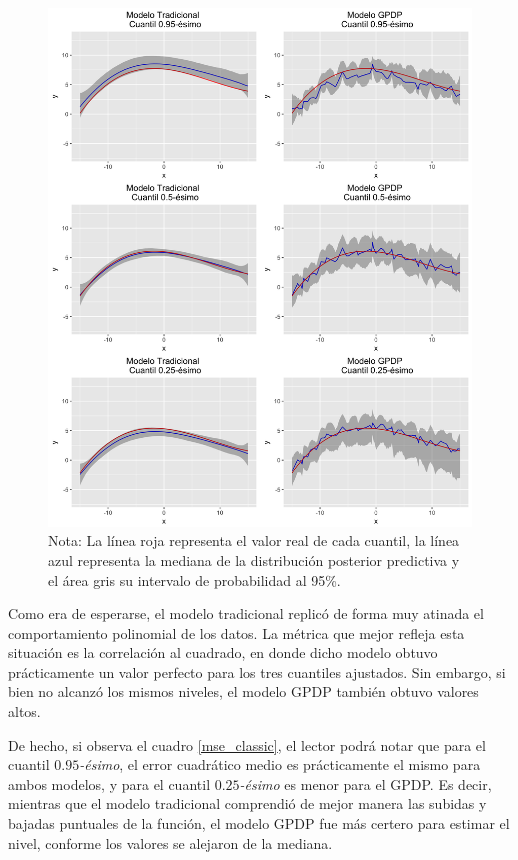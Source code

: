 \begin{figure}[htbp]
	\centering
	\caption{Ajuste de los modelos Tradicional y \textit{GPDP}, para un conjunto de datos que cumplen los supuestos tradicionales de regresi\'on.}
	\includegraphics[width=\textwidth]{Figures/Simulation/classic/predictions.png}
	\captionsetup{singlelinecheck=off,font=footnotesize}
    \caption*{Nota: La l\'inea roja representa el valor real de cada cuantil, la l\'inea azul representa la mediana de la distribuci\'on posterior predictiva y el \'area gris su intervalo de probabilidad al 95\%.}
	\label{models_classic}
\end{figure}

Como era de esperarse, el modelo tradicional replic\'o de forma muy atinada el comportamiento polinomial de los datos. La m\'etrica que mejor refleja esta situaci\'on es la correlaci\'on al cuadrado, en donde dicho modelo obtuvo pr\'acticamente un valor perfecto para los tres cuantiles ajustados. Sin embargo, si bien no alcanz\'o los mismos niveles, el modelo GPDP tambi\'en obtuvo valores altos.

De hecho, si observa el cuadro \ref{mse_classic}, el lector podr\'a notar que para el cuantil $0.95$\textit{-\'esimo}, el error cuadr\'atico medio es pr\'acticamente el mismo para ambos modelos, y para el cuantil $0.25$\textit{-\'esimo} es menor para el GPDP. Es decir, mientras que el modelo tradicional comprendi\'o de mejor manera las subidas y bajadas puntuales de la funci\'on, el modelo GPDP fue m\'as certero para estimar el nivel, conforme los valores se alejaron de la mediana. 

